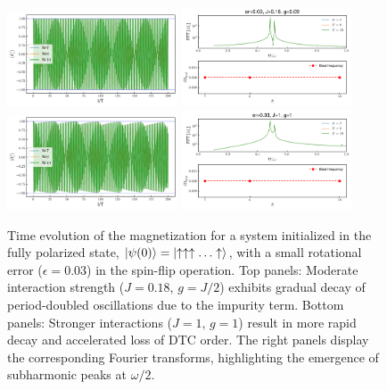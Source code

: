 \documentclass[a4paper, 10pt]{article}
\begin{document}
\begin{figure}[h!]
    \centering
    \includegraphics[width=0.45\textwidth]{figs/DTC_mag_inset_er=0.03_J=0.18_g=0.09.pdf}
    \includegraphics[width=0.45\textwidth]{figs/DTC_mag_fft_inset_er=0.03_J=0.18_g=0.09.pdf}\\
    \includegraphics[width=0.45\textwidth]{figs/DTC_mag_inset_er=0.03_J=1_g=1.pdf}
    \includegraphics[width=0.45\textwidth]{figs/DTC_mag_fft_inset_er=0.03_J=1_g=1.pdf}
    \caption{Time evolution of the magnetization for a system initialized in the fully polarized state, $\ket{\psi(0)} = \ket{\uparrow \uparrow \uparrow \ldots \uparrow}$, with a small rotational error ($\epsilon = 0.03$) in the spin-flip operation. Top panels: Moderate interaction strength ($J=0.18$, $g=J/2$) exhibits gradual decay of period-doubled oscillations due to the impurity term. Bottom panels: Stronger interactions ($J=1$, $g=1$) result in more rapid decay and accelerated loss of DTC order. The right panels display the corresponding Fourier transforms, highlighting the emergence of subharmonic peaks at $\omega/2$.}
    \label{figs:clean_flatband_dtc_er}
\end{figure}
\end{document}
